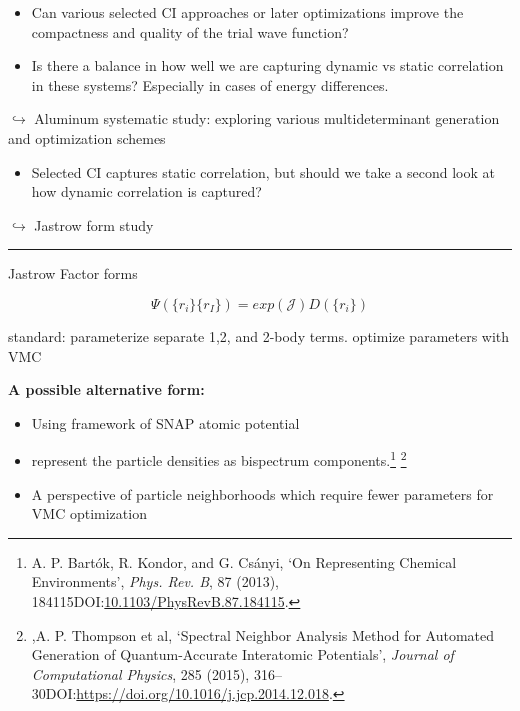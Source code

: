 \documentclass[
  letterpaper,
  DIV=11,
  numbers=noendperiod]{scrartcl}
\providecommand{\tightlist}{%
  \setlength{\itemsep}{0pt}\setlength{\parskip}{0pt}}\usepackage{longtable,booktabs,array}
\begin{document}
\begin{itemize}
\tightlist
\item
  Can various selected CI approaches or later optimizations improve the
  compactness and quality of the trial wave function?
\end{itemize}

\begin{itemize}
\tightlist
\item
  Is there a balance in how well we are capturing dynamic vs static
  correlation in these systems? Especially in cases of energy
  differences.
\end{itemize}

\(\hookrightarrow\) Aluminum systematic study: exploring various
multideterminant generation and optimization schemes

\begin{itemize}
\tightlist
\item
  Selected CI captures static correlation, but should we take a second
  look at how dynamic correlation is captured?
\end{itemize}

{ \(\hookrightarrow\) Jastrow form study}

\begin{center}\rule{0.5\linewidth}{0.5pt}\end{center}

Jastrow Factor forms

\[\Psi(\{r_i\}\{r_I\})=exp(\mathcal{J})D(\{r_{i}\})\]

standard: parameterize separate 1,2, and 2-body terms. optimize
parameters with VMC

\textbf{A possible alternative form:}

\begin{itemize}
\item
  Using framework of SNAP atomic potential
\item
  represent the particle densities as bispectrum components.\footnote{A.
    P. Bartók, R. Kondor, and G. Csányi, {`On Representing Chemical
    Environments'}, \emph{Phys. Rev. B}, 87 (2013),
    184115DOI:\href{https://doi.org/10.1103/PhysRevB.87.184115}{10.1103/PhysRevB.87.184115}.}
  \footnote{,A. P. Thompson et al, {`Spectral Neighbor Analysis Method
    for Automated Generation of Quantum-Accurate Interatomic
    Potentials'}, \emph{Journal of Computational Physics}, 285 (2015),
    316--30DOI:\url{https://doi.org/10.1016/j.jcp.2014.12.018}.}
\item
  A perspective of particle neighborhoods which require fewer parameters
  for VMC optimization
\end{itemize}
\end{document}
